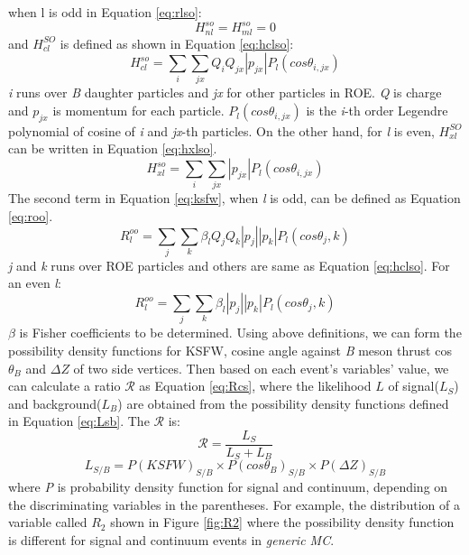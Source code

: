 when l is odd in Equation \ref{eq:rlso}: 
\begin{equation}
	H_{nl}^{so}=H_{ml}^{so}=0
\end{equation}
and $H_{cl}^{SO}$ is defined as shown in Equation \ref{eq:hclso}: 
\begin{equation}\label{eq:hclso}
	H_{cl}^{so} = \sum_i \sum_{jx}Q_i Q_{jx}|p_{jx}|P_l(cos\theta_{i,jx})
\end{equation}
\textit{i} runs over \textit{B} daughter particles and \textit{jx} for other particles in ROE. \textit{Q} is charge and $p_{jx}$ is momentum for each particle. $P_l(cos\theta_{i,jx})$ is the \textit{i}-th order Legendre polynomial of cosine of \textit{i} and \textit{jx}-th particles.
On the other hand, for \textit{l} is even, $H_{xl}^{SO}$ can be written in Equation \ref{eq:hxlso}.
\begin{equation}\label{eq:hxlso}
	H_{xl}^{so}=\sum_i \sum_{jx}|p_{jx}|P_l(cos\theta_{i,jx})
\end{equation}
The second term in Equation \ref{eq:ksfw}, when \textit{l} is odd, can be defined as Equation \ref{eq:roo}.
\begin{equation}\label{eq:roo}
	R^{oo}_l = \sum_j \sum_k \beta_l Q_j Q_k |p_j||p_k|P_l(cos\theta_j,k)
\end{equation}
\textit{j} and \textit{k} runs over ROE particles and others are same as Equation \ref{eq:hclso}.
For an even \textit{l}: 
\begin{equation}
	R^{oo}_l = \sum_j \sum_k \beta_l |p_j||p_k|P_l(cos\theta_j,k)
\end{equation}
$\beta$ is Fisher coefficients to be determined. 
Using above definitions, we can form the possibility density functions for KSFW, cosine angle against \textit{B} meson thrust cos$\theta_B$ and $\Delta Z$ of two side vertices.  Then based on each event's variables' value, we can calculate a ratio $\mathcal{R}$ as Equation \ref{eq:Rcs}, where the likelihood $L$ of signal($L_S$) and background($L_B$) are obtained from the possibility density functions defined in Equation \ref{eq:Lsb}.
The $ \mathcal{R} $ is: 
\begin{equation}\label{eq:Rcs}
	\mathcal{R} = \frac{L_S}{L_S+L_B}
\end{equation}
\begin{equation}\label{eq:Lsb}
L_{S/B} = P(KSFW)_{S/B} \times P(cos\theta_B)_{S/B} \times P(\Delta Z)_{S/B}
\end{equation}
where \textit{P} is probability density function for signal and continuum, depending on the discriminating variables in the parentheses. For example, the distribution of a variable called $R_2$ shown in Figure \ref{fig:R2} where the possibility density function is different for signal and continuum events in \textit{generic MC}.

